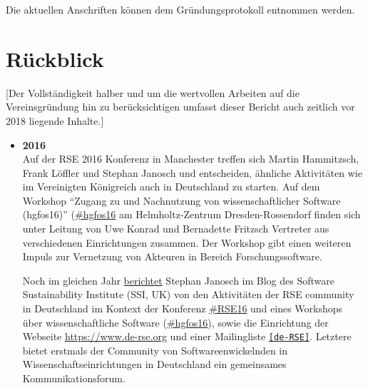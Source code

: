 Die aktuellen Anschriften können dem Gründungsprotokoll entnommen werden.

\section{Rückblick}

[Der Vollständigkeit halber und um die wertvollen Arbeiten auf die Vereinsgründung hin zu berücksichtigen umfasst dieser Bericht auch zeitlich vor 2018 liegende Inhalte.]

\begin{itemize}
 \item \textbf{2016}\\
 Auf der RSE 2016 Konferenz in Manchester treffen sich Martin Hammitzsch, Frank Löffler und Stephan Janosch und entscheiden, ähnliche Aktivitäten wie im Vereinigten Königreich auch in Deutschland zu starten. Auf dem Workshop "`Zugang zu und Nachnutzung von wissenschaftlicher Software (hgfos16)"' (\href{https://twitter.com/hashtag/hgfos16}{\#hgfos16} am Helmholtz-Zentrum Dresden-Rossendorf finden sich unter Leitung von Uwe Konrad und Bernadette Fritzsch Vertreter aus verschiedenen Einrichtungen zusammen. Der Workshop gibt einen weiteren Impuls zur Vernetzung von Akteuren in Bereich Forschungssoftware.
 
 Noch im gleichen Jahr \href{https://www.software.ac.uk/blog/2016-12-19-research-software-germany-brief-report-efforts-autumn-2016}{berichtet} Stephan Janosch im Blog des Software Sustainability Institute (SSI, UK) von den Aktivitäten der RSE community in Deutschland im Kontext der Konferenz \href{https://ukrse.github.io/conf2016.html}{\#RSE16} und eines Workshops über wissenschaftliche Software (\href{https://twitter.com/hashtag/hgfos16}{\#hgfos16}), sowie die Einrichtung der Webseite \href{https://www.de-rse.org}{https://www.de-rse.org} und einer Mailingliste \href{https://ml-cgn04.ispgateway.de/mailman/listinfo/liste_de-rse.org}{\texttt{[de-RSE]}}.
 Letztere bietet erstmals der Community von Softwareenwickelnden in Wissenschaftseinrichtungen in Deutschland ein gemeinsames Kommunikationsforum.


\end{itemize}

